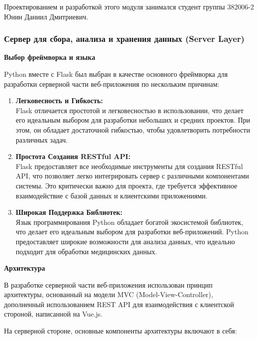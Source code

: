 \documentclass[12pt, russian]{extarticle}
\begin{document}
\begin{spacing}{1.5}
Проектированием и разработкой этого модуля занимался студент группы 382006-2 Юнин Даниил Дмитриевич.

\subsubsection{Сервер для сбора, анализа и хранения данных (Server Layer)}

\par \noindent \textbf{Выбор фреймворка и языка}

Python вместе с Flask был выбран в качестве основного фреймворка для разработки серверной части веб-приложения по нескольким причинам:

\begin{enumerate}
    \item \textbf{Легковесность и Гибкость:} \\
        Flask отличается простотой и легковесностью в использовании, что делает его идеальным выбором для разработки небольших и средних проектов. При этом, он обладает достаточной гибкостью, чтобы удовлетворить потребности различных задач.
    \item \textbf{Простота Создания RESTful API:} \\
        Flask предоставляет все необходимые инструменты для создания RESTful API, что позволяет легко интегрировать сервер с различными компонентами системы. Это критически важно для проекта, где требуется эффективное взаимодействие с базой данных и клиентскими приложениями.
    \item \textbf{Широкая Поддержка Библиотек:} \\
        Язык программирования Python обладает богатой экосистемой библиотек, что делает его идеальным выбором для разработки веб-приложений. Python предоставляет широкие возможности для анализа данных, что идеально подходит для обработки медицинских данных.
\end{enumerate}

\par \noindent \textbf{Архитектура}

В разработке серверной части веб-приложения использован принцип архитектуры, основанный на модели MVC (Model-View-Controller), дополненный использованием REST API для взаимодействия с клиентской стороной, написанной на Vue.js.

\noindent На серверной стороне, основные компоненты архитектуры включают в себя:


\end{spacing}
\end{document}
